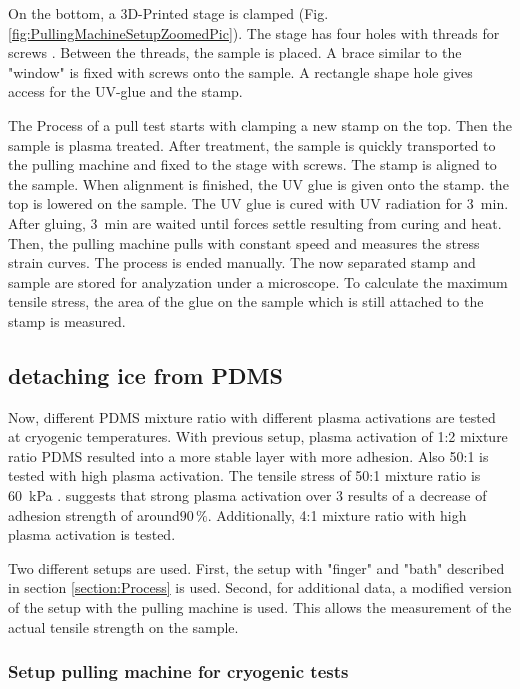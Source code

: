 On the bottom, a 3D-Printed stage is clamped (Fig. \ref{fig:PullingMachineSetupZoomedPic}). The stage has four holes with threads for screws . Between the threads, the sample is placed. A brace similar to the "window" is fixed with screws onto the sample. A rectangle shape hole gives access for the UV-glue and the stamp. 

The Process of a pull test starts with clamping a new stamp on the top. Then the sample is plasma treated. After treatment, the sample is quickly transported to the pulling machine and fixed to the stage with screws. The stamp is aligned to the sample. When alignment is finished, the UV glue is given onto the stamp. the top is lowered on the sample. The UV glue is cured with UV radiation for \SI{3}{\minute}. After gluing, \SI{3}{\minute} are waited until forces settle resulting from curing and heat. Then, the pulling machine pulls with constant speed and measures the stress strain curves. The process is ended manually. The now separated stamp and sample are stored for analyzation under a microscope. To calculate the maximum tensile stress, the area of the glue on the sample which is still attached to the stamp is measured.

\subsection{detaching ice from PDMS}

Now, different PDMS mixture ratio with different plasma activations are tested at cryogenic temperatures. With previous setup, plasma activation of 1:2 mixture ratio PDMS resulted into a more stable layer with more adhesion. Also 50:1 is tested with high plasma activation. The tensile stress of 50:1 mixture ratio is \SI{60}{\kilo\pascal} \cite{IbanezIbanez.2022}.  \cite{Ohishi.2017} suggests that strong plasma activation over \SI{3}{\min} results of a decrease of adhesion strength of around$90\,\%$. Additionally, 4:1 mixture ratio with high plasma activation is tested.

Two different setups are used. First, the setup with "finger" and "bath" described in section \ref{section:Process} is used. Second, for additional data, a modified version of the setup with the pulling machine is used. This allows the measurement of the actual tensile strength on the sample. 

\subsubsection{Setup pulling machine for cryogenic tests}

